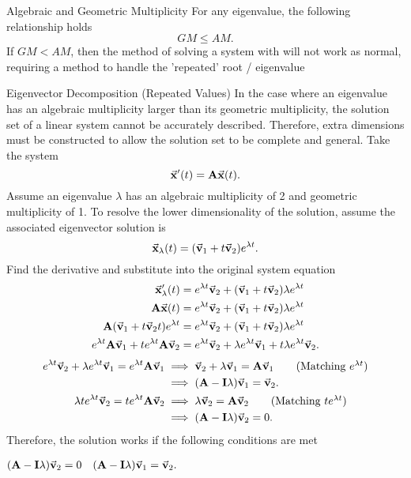 \documentclass[../notes.tex]{subfiles}
\begin{document}
\begin{stickynote}{Algebraic and Geometric Multiplicity}
    For any eigenvalue, the following relationship holds
    \[
        GM \le AM
    .\]
    If $GM < AM$, then the method of solving a system with  will not work as normal, requiring a method to handle the 'repeated' root / eigenvalue
\end{stickynote}

\begin{stickynote}{Eigenvector Decomposition (Repeated Values)}
    \label{nt:repeatedeig}
    \newcommand{\expone}{e^{\lambda t}}
    In the case where an eigenvalue has an algebraic multiplicity larger than its geometric multiplicity, the solution set of a linear system cannot be accurately described. Therefore, extra dimensions must be constructed to allow the solution set to be complete and general. Take the system
    \[
        \va{x}'(t) = \vb{A}\va{x}(t)
    .\]
    Assume an eigenvalue $\lambda$ has an algebraic multiplicity of 2 and geometric multiplicity of 1. To resolve the lower dimensionality of the solution, assume the associated eigenvector solution is
    \[
        \va{x}_{\lambda}(t) = \qty(\va{v}_1 + t\va{v}_2)\expone
    .\]
    Find the derivative and substitute into the original system equation
    \begin{align*}
        \va{x}'_{\lambda}(t) &= \expone\va{v}_2 + \qty(\va{v}_1 + t\va{v}_2)\lambda\expone \\
        \vb{A}\va{x}(t)&= \expone\va{v}_2 + \qty(\va{v}_1 + t\va{v}_2)\lambda\expone \\
        \vb{A}(\va{v}_1 + t \va{v}_2 t)\expone &= \expone\va{v}_2 + \qty(\va{v}_1 + t\va{v}_2)\lambda\expone \\
        \expone\vb{A}\va{v}_1 + t\expone\vb{A}\va{v}_2 &= \expone\va{v}_2 + \lambda\expone\va{v}_1 + t\lambda\expone\va{v}_2
    .\end{align*}
    \begin{align*}
        \expone \va{v}_2 + \lambda\expone\va{v}_1 = \expone\vb{A}\va{v}_1 &\implies \va{v}_2 + \lambda\va{v}_1 = \vb{A}\va{v}_1 \tag{Matching $\expone$} \\
            &\implies (\vb{A} - \vb{I}\lambda) \va{v}_1 = \va{v}_2 .\\
        \lambda t \expone \va{v}_2 = t \expone\vb{A}\va{v}_2 &\implies \lambda\va{v}_2 = \vb{A}\va{v}_2 \tag{Matching $t\expone$} \\
            &\implies (\vb{A} - \vb{I}\lambda)\va{v}_2 = 0
    .\end{align*}
    Therefore, the solution works if the following conditions are met

    \centering
    \begin{eqbox}
        $\begin{aligned}
            & (\vb{A} - \vb{I}\lambda)\va{v}_2 = 0 &
            (\vb{A} - \vb{I}\lambda) \va{v}_1 = \va{v}_2 &
        .\end{aligned}$
    \end{eqbox}
\end{stickynote}
\end{document}
